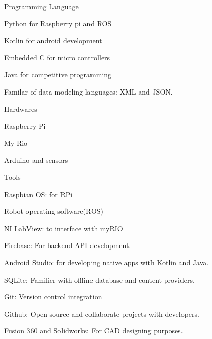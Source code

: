 \begin{cventries}
  \cventry
    {Programming Language}
    {}
    {}
    {}
    {
      \begin{cvitems}
       \item {Python for Raspberry pi and ROS}
        \item {Kotlin for android development}
        \item {Embedded C for micro controllers}
        \item {Java for competitive programming}
        \item {Familar of data modeling languages: XML and JSON.}
      \end{cvitems}
    }

    \cventry
    {Hardwares}
    {}
    {}
    {}
    {
      \begin{cvitems}
        \item {Raspberry Pi}
        \item {My Rio}
        \item {Arduino and sensors}
      \end{cvitems}
    }

    \cventry
    {Tools}
    {}
    {}
    {}
    {
      \begin{cvitems}
        \item {Raspbian OS: for RPi}
        \item{Robot operating software(ROS)}
        \item{NI LabView: to interface with myRIO}
        \item {Firebase: For backend API development.}
        \item {Android Studio: for developing native apps with Kotlin and Java.}
        \item {SQLite: Familier with offline database and content providers.}
        \item {Git: Version control integration}
        \item {Github: Open source and collaborate projects with developers.}
        \item{Fusion 360 and Solidworks: For CAD designing purposes.}
      \end{cvitems}
    }
\end{cventries}

